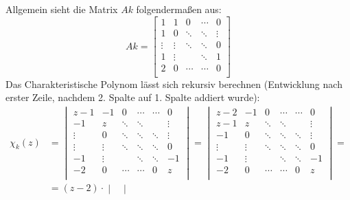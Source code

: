 \begin{flushenum}
\item Allgemein sieht die Matrix $Ak$ folgendermaßen aus:
	\[ Ak = \begin{bmatrix}
			1      & 1      & 0      & \cdots & 0      \\
			1      & 0      & \ddots & \ddots & \vdots \\
			\vdots & \vdots & \ddots & \ddots & 0      \\
			1      & \vdots &        & \ddots & 1      \\
			2      & 0      & \cdots & \cdots & 0      \\
		\end{bmatrix} \]
	Das Charakteristische Polynom lässt sich rekursiv berechnen (Entwicklung nach erster Zeile,
	nachdem 2. Spalte auf 1. Spalte addiert wurde):
	\begin{align*}
		\chi_k(z) & =
				\begin{vmatrix}
					z-1    & -1     & 0      & \cdots & \cdots & 0      \\
					-1     & z      & \ddots & \ddots &        & \vdots \\
					\vdots & 0      & \ddots & \ddots & \ddots & \vdots \\
					\vdots & \vdots & \ddots & \ddots & \ddots & 0      \\
					-1     & \vdots &        & \ddots & \ddots & -1     \\
					-2     & 0      & \cdots & \cdots & 0      & z      \\
				\end{vmatrix} = %
				\begin{vmatrix}
					z-2    & -1     & 0      & \cdots & \cdots & 0      \\
					z-1    & z      & \ddots & \ddots &        & \vdots \\
					-1     & 0      & \ddots & \ddots & \ddots & \vdots \\
					\vdots & \vdots & \ddots & \ddots & \ddots & 0      \\
					-1     & \vdots &        & \ddots & \ddots & -1     \\
					-2     & 0      & \cdots & \cdots & 0      & z      \\
				\end{vmatrix} = \\%
			& = (z-2) \cdot
				\begin{vmatrix}

\end{vmatrix}
\end{align*}
\end{flushenum}

